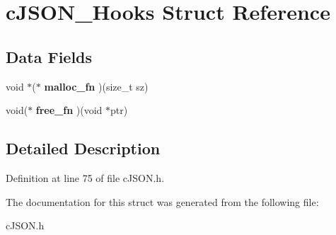 \hypertarget{structc_j_s_o_n___hooks}{}\section{c\+J\+S\+O\+N\+\_\+\+Hooks Struct Reference}
\label{structc_j_s_o_n___hooks}
\subsection*{Data Fields}
\begin{DoxyCompactItemize}
\item 
\mbox{\label{structc_j_s_o_n___hooks_a7f7cfcc2ea2d783405e6f4f6eab99ec7}} 
void $\ast$($\ast$ {\bfseries malloc\+\_\+fn} )(size\+\_\+t sz)
\item 
\mbox{\label{structc_j_s_o_n___hooks_a53e4e91f1e224c1e78c5d1fff7039372}} 
void($\ast$ {\bfseries free\+\_\+fn} )(void $\ast$ptr)
\end{DoxyCompactItemize}


\subsection{Detailed Description}


Definition at line 75 of file c\+J\+S\+O\+N.\+h.



The documentation for this struct was generated from the following file\+:\begin{DoxyCompactItemize}
\item 
c\+J\+S\+O\+N.\+h\end{DoxyCompactItemize}
